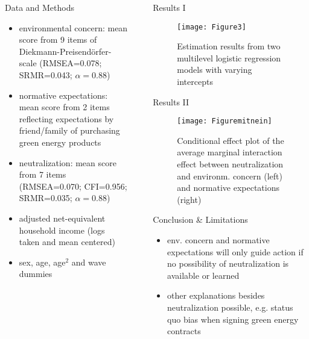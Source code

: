\documentclass[final]{beamer}
\newlength{\sepwidth}
\newlength{\colwidth}
\newcommand{\separatorcolumn}{\begin{column}{\sepwidth}\end{column}}
\begin{document}
\begin{frame}[t]
\begin{columns}[t]
\begin{column}{\colwidth}
\begin{block}{Data and Methods}
\begin{itemize}
	\item environmental concern: mean score from 9 items of Diekmann-Preisendörfer-scale (RMSEA=0.078; SRMR=0.043; $\alpha=0.88$)
	\item normative expectations: mean score from 2 items reflecting expectations by friend/family of purchasing green energy products
	\item neutralization: mean score from 7 items (RMSEA=0.070; CFI=0.956; SRMR=0.035; $\alpha=0.88$)
	\item adjusted net-equivalent household income (logs taken and mean centered)
	\item sex, age, age$^{2}$ and wave dummies
\end{itemize}
\end{block}
 

\end{column}

\separatorcolumn


\begin{column}{\colwidth}

\begin{block}{Results I}

   \begin{figure}
	\centering
		\texttt{[image: Figure3]}
		\caption{Estimation results from two multilevel logistic regression models with varying intercepts}
\end{figure}

\end{block}



  \begin{block}{Results II}

   \begin{figure}
	\centering
		\texttt{[image: Figuremitnein]}
		\caption{Conditional effect plot of the average marginal interaction effect between neutralization and environm. concern (left) and normative expectations (right)}
\end{figure}

  \end{block}

  \begin{block}{Conclusion \& Limitations}  
	\begin{itemize}
		\item env. concern and normative expectations will only guide action 
if no possibility of neutralization is available or learned
    \item other explanations besides neutralization possible, e.g.  status quo bias when signing green energy contracts
	\end{itemize}
\end{block}


\end{column}
\end{columns}
\end{frame}
\end{document}
